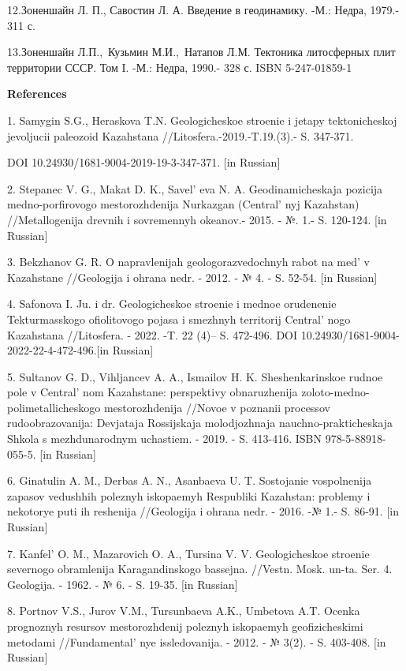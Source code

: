 12.Зоненшайн Л. П., Савостин Л. А. Введение в геодинамику. -М.: Недра,
1979.- 311 с.

13.Зоненшайн Л.П.,~Кузьмин М.И.,~Натапов Л.М. Тектоника литосферных плит
территории СССР. Том I. -М.: Недра, 1990.- 328 с. ISBN 5-247-01859-1

{\bfseries References}

1. Samygin S.G., Heraskova T.N. Geologicheskoe stroenie i jetapy
tektonicheskoj jevoljucii paleozoid Kazahstana
//Litosfera.-2019.-T.19.(3).- S. 347-371.

DOI 10.24930/1681-9004-2019-19-3-347-371. {[}in Russian{]}

2. Stepanec V. G., Makat D. K., Savel' eva N. A.
Geodinamicheskaja pozicija medno-porfirovogo mestorozhdenija Nurkazgan
(Central' nyj Kazahstan) //Metallogenija drevnih i
sovremennyh okeanov.- 2015. - №. 1.- S. 120-124. {[}in Russian{]}

3. Bekzhanov G. R. O napravlenijah geologorazvedochnyh rabot na
med'{} v Kazahstane //Geologija i ohrana nedr. - 2012. -
№ 4. - S. 52-54. {[}in Russian{]}

4. Safonova I. Ju. i dr. Geologicheskoe stroenie i mednoe orudenenie
Tekturmasskogo ofiolitovogo pojasa i smezhnyh territorij
Central' nogo Kazahstana //Litosfera. - 2022. -T. 22
(4)-- S. 472-496. DOI 10.24930/1681-9004-2022-22-4-472-496.{[}in
Russian{]}

5. Sultanov G. D., Vihljancev A. A., Ismailov H. K. Sheshenkarinskoe
rudnoe pole v Central' nom Kazahstane: perspektivy
obnaruzhenija zoloto-medno-polimetallicheskogo mestorozhdenija //Novoe v
poznanii processov rudoobrazovanija: Devjataja Rossijskaja molodjozhnaja
nauchno-prakticheskaja Shkola s mezhdunarodnym uchastiem. - 2019. - S.
413-416. ISBN 978-5-88918-055-5. {[}in Russian{]}

6. Ginatulin A. M., Derbas A. N., Asanbaeva U. T. Sostojanie
vospolnenija zapasov vedushhih poleznyh iskopaemyh Respubliki Kazahstan:
problemy i nekotorye puti ih reshenija //Geologija i ohrana nedr. -
2016. -№ 1.- S. 86-91. {[}in Russian{]}

7. Kanfel'{} O. M., Mazarovich O. A., Tursina V. V.
Geologicheskoe stroenie severnogo obramlenija Karagandinskogo bassejna.
//Vestn. Mosk. un-ta. Ser. 4. Geologija. - 1962. - № 6. - S. 19-35.
{[}in Russian{]}

8. Portnov V.S., Jurov V.M., Tursunbaeva A.K., Umbetova A.T. Ocenka
prognoznyh resursov mestorozhdenij poleznyh iskopaemyh geofizicheskimi
metodami //Fundamental' nye issledovanija. - 2012. - №
3(2). - S. 403-408. {[}in Russian{]}

